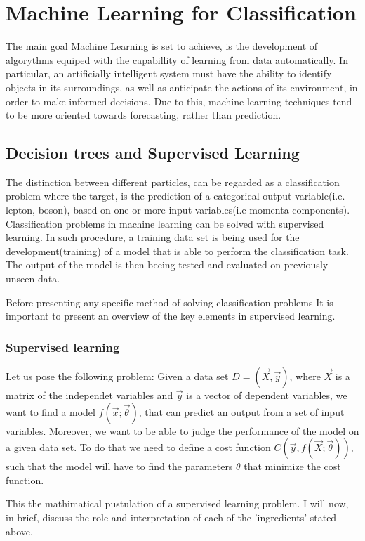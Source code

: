 \section{Machine Learning for Classification}
\label{sec:orge6a77e6}
The main goal Machine Learning is set to achieve, is the development of algorythms equiped with the capabillity of learning from data automatically. In particular, an artificially intelligent system must have the ability to identify objects in its surroundings, as well as anticipate the actions of its environment, in order to make informed decisions. Due to this, machine learning techniques tend to be more oriented towards forecasting, rather than prediction.
\subsection{Decision trees and Supervised Learning}
\label{sec:org68cc4e5}
The distinction between different particles, can be regarded as a classification problem where the target, is the prediction of a categorical output variable(i.e. lepton, boson), based on one or more input variables(i.e momenta components). Classification problems in  machine learning can be solved with supervised learning. In such procedure, a training data set is being used for the development(training) of a model that is able to perform the classification task. The output of the model is then beeing tested and evaluated on previously unseen data.

Before presenting any specific method of solving classification problems It is important to present an overview of the key elements in supervised learning.

\subsubsection{Supervised learning}
\label{sec:org0051e97}
Let us pose the following problem:
Given a data set \(D= (\vec{X}, \vec{y})\), where \(\vec{X}\) is a matrix of the independet variables and \(\vec{y}\) is a vector of dependent variables, we want to find a model \(f(\vec{x} ; \vec{\theta})\),  that can predict an output from a set of input variables. Moreover, we  want to be able to judge the performance of the model on a given data set. To do that we need to define a cost function \(C(\vec{y}, f(\vec{X}; \vec{\theta}))\), such that the model will have to find the parameters \(\theta\) that minimize the cost function.\cite{Mehta_2019}

This the mathimatical pustulation of a supervised learning problem. I will now, in brief, discuss the role and interpretation of each of the 'ingredients' stated above.

